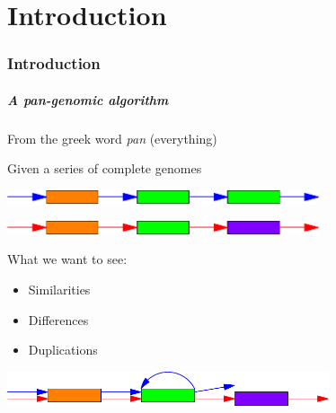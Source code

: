 \part{Introduction}
\section{Introduction}


\begin{frame}
	\partpage
	\centering
\end{frame}


\begin{frame}
	\frametitle{A pan-genomic algorithm}
	\centering
	
	From the greek word \textit{pan} (everything)
	
	\medskip
	
	Given a series of complete genomes
	
	\medskip

	\includegraphics[height=0.4cm]{images/gen1}

  \medskip
  	
	\includegraphics[height=0.4cm]{images/gen2}
	
	\medskip

  What we want to see:
  
  \begin{itemize}
    \item Similarities
    \item Differences
    \item Duplications
  \end{itemize}	
	
	\medskip
	
	\includegraphics[height=1cm]{images/gen3}
	
\end{frame}


